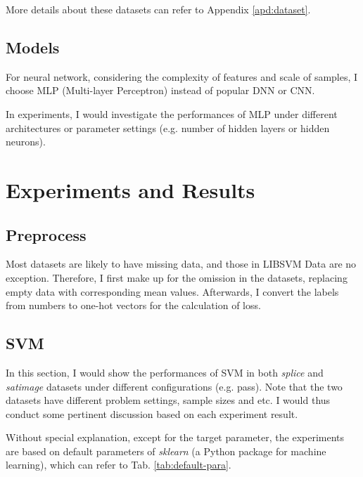 \documentclass[12pt,a4paper]{article}
\theoremstyle{definition}
\begin{document}
More details about these datasets can refer to Appendix \ref{apd:dataset}.

\subsection{Models}

For neural network, considering the complexity of features and scale of samples, I choose MLP (Multi-layer Perceptron) instead of popular DNN or CNN.

\vspace{0.01\linewidth}
In experiments, I would investigate the performances of MLP under different architectures or parameter settings (e.g. number of hidden layers or hidden neurons).

\section{Experiments and Results}

\subsection{Preprocess}

Most datasets are likely to have missing data, and those in LIBSVM Data are no exception. Therefore, I first make up for the omission in the datasets, replacing empty data with corresponding mean values. Afterwards, I convert the labels from numbers to one-hot vectors for the calculation of loss.

\subsection{SVM}
\label{sec:svm}

In this section, I would show the performances of SVM in both \textit{splice} and \textit{satimage} datasets under different configurations (e.g. pass). Note that the two datasets have different problem settings, sample sizes and etc. I would thus conduct some pertinent discussion based on each experiment result.

\vspace{0.01\linewidth}
Without special explanation, except for the target parameter, the experiments are based on default parameters of \textit{sklearn} \cite{sklearn} (a Python package for machine learning), which can refer to Tab. \ref{tab:default-para}.
\end{document}

